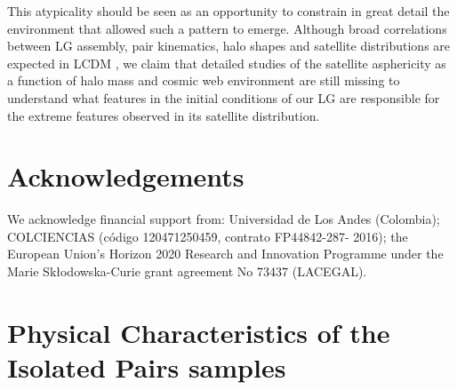 \documentclass[a4paper,fleqn,usenatbib]{mnras}
\begin{document}
This atypicality should be seen as an opportunity to constrain in
great detail the environment that allowed such a pattern to emerge. 
Although broad correlations between LG assembly, pair kinematics, halo
shapes and satellite distributions are expected in LCDM
\citep{2011MNRAS.417.1434F,2014MNRAS.443.1090F,2015ApJ...799...45F,2015MNRAS.452.1052L},
we claim that detailed studies of the satellite asphericity as a function
of halo mass and cosmic web environment are still missing to
understand what features in the initial conditions of our LG
are responsible for the extreme features observed in its satellite
distribution.

\section*{Acknowledgements} 
We acknowledge financial support from: Universidad de Los Andes
(Colombia); COLCIENCIAS (c\'odigo 120471250459, contrato FP44842-287-
2016); the European Union's Horizon 2020 Research and Innovation
Programme under the Marie Sk\l{}odowska-Curie grant agreement No 73437
(LACEGAL).  
  



\appendix


\section{Physical Characteristics of the Isolated Pairs samples}
\label{appendix:physical}
\end{document}
